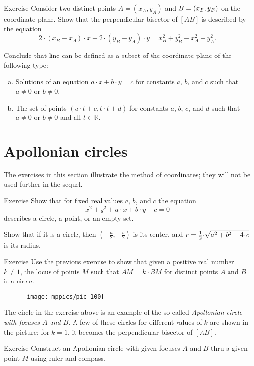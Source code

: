 \begin{thm}{Exercise}\label{ex:line-coord}
Consider two distinct points $A=(x_A,y_A)$ and $B=(x_B,y_B)$ on the coordinate plane.
Show that the perpendicular bisector of $[AB]$ is described by the equation
\[2\cdot (x_B-x_A)\cdot x+2\cdot (y_B-y_A)\cdot y=x_B^2+y_B^2-x_A^2-y_A^2.\]

Conclude that line can be defined as a subset of the coordinate plane of the following type:
\begin{enumerate}[(a)]
\item  Solutions of an equation $a\cdot x+b\cdot y=c$
for constants $a$, $b$, and $c$ such that $a\ne 0$ or $b\ne0$.
\item\label{ex:line-coord:parameter} The set of points $(a\cdot t+c,b\cdot t+d)$ for constants $a$, $b$, $c$, and $d$ such that $a\ne 0$ or $b\ne0$ and all $t\in \mathbb{R}$.
\end{enumerate}

\end{thm}

\section{Apollonian circles}\label{sec:Apollonian circle}
The exercises in this section illustrate the method of coordinates; they will not be used further in the sequel.

\begin{thm}{Exercise}\label{ex:circle-coord}
Show that for fixed real values $a$, $b$, and $c$ the equation 
\[x^2+y^2+a\cdot x+b\cdot y+c=0\]
describes a circle, a point, or an empty set.

Show that if it is a circle, then $(-\tfrac a2,-\tfrac b2)$ is its center,
and $r\z=\tfrac12\cdot \sqrt{a^2+b^2-4\cdot c}$ is its radius.
\end{thm}

\begin{thm}{Exercise}\label{ex:apolonnius}
Use the previous exercise to show that given a positive real number $k\ne1$,
the locus of points $M$ such that $AM=k\cdot BM$ 
for distinct points $A$ and $B$
is a circle. 
\end{thm}

\begin{figure}[!ht]
\centering
\texttt{[image: mppics/pic-100]}
\end{figure}

The circle in the exercise above is an example of the so-called \emph{Apollonian circle with focuses $A$ and $B$}.
A few of these circles for different values of $k$ are shown in the picture;
for $k=1$, it becomes the perpendicular bisector of $[AB]$.


\begin{thm}{Exercise}\label{ex:apolonnius-construction}
Construct an Apollonian circle with given focuses $A$ and $B$ thru a given point $M$ using ruler and compass.
\end{thm}
